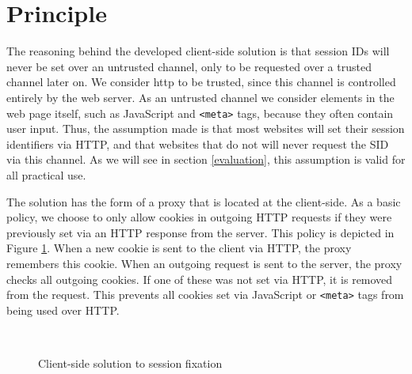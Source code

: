 \section{Principle}\label{principle}

The reasoning behind the developed client-side solution is that session IDs will never be set over an untrusted channel, only to be requested over a trusted channel later on. We consider \gls{http} to be trusted, since this channel is controlled entirely by the web server. As an untrusted channel we consider elements in the web page itself, such as JavaScript and \texttt{<meta>} tags, because they often contain user input. Thus, the assumption made is that most websites will set their session identifiers via HTTP, and that websites that do not will never request the SID via this channel. As we will see in section \ref{evaluation}, this assumption is valid for all practical use.

The solution has the form of a proxy that is located at the client-side. As a basic policy, we choose to only allow cookies in outgoing HTTP requests if they were previously set via an HTTP response from the server. This policy is depicted in Figure \ref{fig:clientside-proxy}. When a new cookie is sent to the client via HTTP, the proxy remembers this cookie. When an outgoing request is sent to the server, the proxy checks all outgoing cookies. If one of these was not set via HTTP, it is removed from the request. This prevents all cookies set via JavaScript or \texttt{<meta>} tags from being used over HTTP.

\begin{figure}[htb]
	\centering
	\\
	\caption{Client-side solution to session fixation}
	\label{fig:clientside-proxy}
\end{figure}

